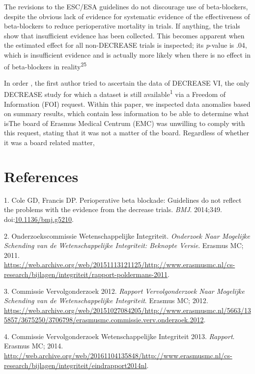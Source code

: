 \documentclass[]{article}
\begin{document}
The revisions to the ESC/ESA guidelines do not discourage use of
beta-blockers, despite the obvious lack of evidence for systematic
evidence of the effectiveness of beta-blockers to reduce perioperative
mortality in trials. If anything, the trials show that insufficient
evidence has been collected. This becomes apparent when the estimated
effect for all non-DECREASE trials is inspected; its \emph{p}-value is
.04, which is insufficient evidence and is actually more likely when
there is no effect in of beta-blockers in reality\textsuperscript{25}

In order , the first author tried to ascertain the data of DECREASE VI,
the only DECREASE study for which a dataset is still
available\textsuperscript{1} via a Freedom of Information (FOI) request.
Within this paper, we inspected data anomalies based on summary results,
which contain less information to be able to determine what isThe board
of Erasmus Medical Centrum (EMC) was unwilling to comply with this
request, stating that it was not a matter of the board. Regardless of
whether it was a board related matter,

\section*{References}\label{references}

\hypertarget{refs}{}
\hypertarget{ref-Coleg5210}{}
1. Cole GD, Francis DP. Perioperative beta blockade: Guidelines do not
reflect the problems with the evidence from the decrease trials.
\emph{BMJ}. 2014;349.
doi:\href{https://doi.org/10.1136/bmj.g5210}{10.1136/bmj.g5210}.

\hypertarget{ref-commissie2011}{}
2. Onderzoekscommissie Wetenschappelijke Integriteit. \emph{Onderzoek
Naar Mogelijke Schending van de Wetenschappelijke Integriteit: Beknopte
Versie}. Erasmus MC; 2011.
\url{https://web.archive.org/web/20151113121125/http://www.erasmusmc.nl/cs-research/bijlagen/integriteit/rapport-poldermans-2011}.

\hypertarget{ref-commissie2012}{}
3. Commissie Vervolgonderzoek 2012. \emph{Rapport Vervolgonderzoek Naar
Mogelijke Schending van de Wetenschappelijke Integriteit}. Erasmus MC;
2012.
\url{https://web.archive.org/web/20151027084205/http://www.erasmusmc.nl/5663/135857/3675250/3706798/erasmusmc.commissie.verv.onderzoek.2012}.

\hypertarget{ref-commissie2013}{}
4. Commissie Vervolgonderzoek Wetenschappelijke Integriteit 2013.
\emph{Rapport}. Erasmus MC; 2014.
\url{http://web.archive.org/web/20161104135848/http://www.erasmusmc.nl/cs-research/bijlagen/integriteit/eindrapport2014nl}.
\end{document}
